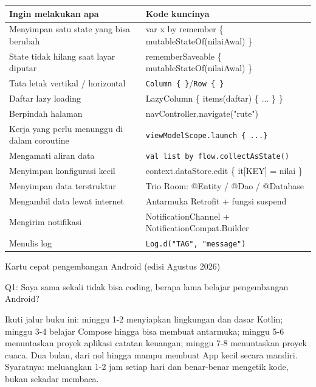 


\begin{center}
\begin{tabularx}{\linewidth}{|X|X|}
\hline
\textbf{Ingin melakukan apa} & \textbf{Kode kuncinya} \tabularnewline
\hline
Menyimpan satu state yang bisa berubah & var x by remember \{ mutableStateOf(nilaiAwal) \} \tabularnewline
State tidak hilang saat layar diputar & rememberSaveable \{ mutableStateOf(nilaiAwal) \} \tabularnewline
Tata letak vertikal / horizontal & \texttt{Column \{ \}}/\texttt{Row \{ \}} \tabularnewline
Daftar lazy loading & LazyColumn \{ items(daftar) \{ ... \} \} \tabularnewline
Berpindah halaman & navController.navigate("rute") \tabularnewline
Kerja yang perlu menunggu di dalam coroutine & \texttt{viewModelScope.\allowbreak launch \{ .\allowbreak .\allowbreak .\allowbreak  \}} \tabularnewline
Mengamati aliran data & \texttt{val list by flow.\allowbreak collectAsState()} \tabularnewline
Menyimpan konfigurasi kecil & context.dataStore.edit \{ it[KEY] = nilai \} \tabularnewline
Menyimpan data terstruktur & Trio Room: @Entity / @Dao / @Database \tabularnewline
Mengambil data lewat internet & Antarmuka Retrofit + fungsi suspend \tabularnewline
Mengirim notifikasi & NotificationChannel + NotificationCompat.Builder \tabularnewline
Menulis log & \texttt{Log.\allowbreak d("TAG", "message")} \tabularnewline
\hline
\end{tabularx}
\end{center}

\begin{center}\small\color{gray}Kartu cepat pengembangan Android (edisi Agustus 2026)\end{center}


Q1: Saya sama sekali tidak bisa coding, berapa lama belajar pengembangan Android?

Ikuti jalur buku ini: minggu 1-2 menyiapkan lingkungan dan dasar Kotlin; minggu 3-4 belajar Compose hingga bisa membuat antarmuka; minggu 5-6 menuntaskan proyek aplikasi catatan keuangan; minggu 7-8 menuntaskan proyek cuaca. Dua bulan, dari nol hingga mampu membuat App kecil secara mandiri. Syaratnya: meluangkan 1-2 jam setiap hari dan benar-benar mengetik kode, bukan sekadar membaca.

